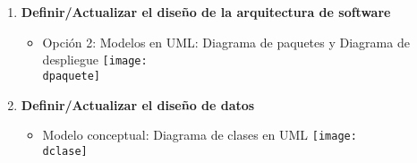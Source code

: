 \newcommand{\dpaquete}{img/d_paquete.png}
\newcommand{\dclase}{img/d_clase.png}
\begin{enumerate}[label=\alph*)]
    \item \large\textbf{Definir/Actualizar el diseño de la arquitectura de software}


    \begin{itemize}
        \item Opción 2: Modelos en UML: Diagrama de paquetes y Diagrama de despliegue
        \centering
        \texttt{[image: \\dpaquete]}\par\vspace{0.3cm}
    \end{itemize}

    \item \large\textbf{Definir/Actualizar el diseño de datos}
    \begin{itemize}
        \item Modelo conceptual: Diagrama de clases en UML
        \centering
        \texttt{[image: \\dclase]}
    \end{itemize}

\end{enumerate}